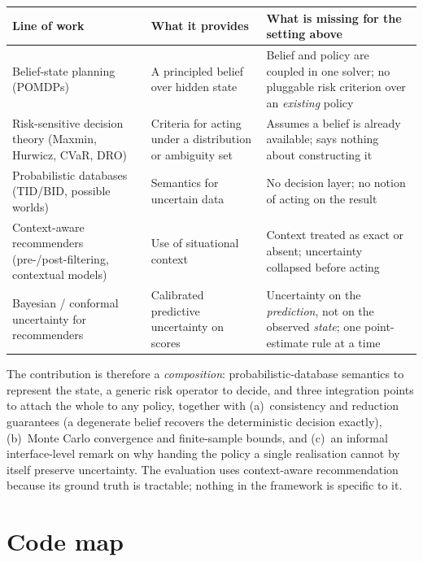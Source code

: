 \documentclass[11pt]{article}
\begin{document}
\begin{center}
\small

\begin{tabular}{>{\raggedright\arraybackslash}p{3.6cm}>{\raggedright\arraybackslash}p{5.3cm}>{\raggedright\arraybackslash}p{5.6cm}}
\toprule
\textbf{Line of work} & \textbf{What it provides} & \textbf{What is missing for the setting above}\\
\midrule
Belief-state planning (POMDPs) & A principled belief over hidden state & Belief and policy are coupled in one solver; no pluggable risk criterion over an \emph{existing} policy\\
Risk-sensitive decision theory (Maxmin, Hurwicz, CVaR, DRO) & Criteria for acting under a distribution or ambiguity set & Assumes a belief is already available; says nothing about constructing it\\
Probabilistic databases (TID/BID, possible worlds) & Semantics for uncertain data & No decision layer; no notion of acting on the result\\
Context-aware recommenders (pre-/post-filtering, contextual models) & Use of situational context & Context treated as exact or absent; uncertainty collapsed before acting\\
Bayesian / conformal uncertainty for recommenders & Calibrated predictive uncertainty on scores & Uncertainty on the \emph{prediction}, not on the observed \emph{state}; one point-estimate rule at a time\\
\bottomrule
\end{tabular}
\end{center}

\noindent The contribution is therefore a \emph{composition}: probabilistic-database semantics to represent the state, a generic risk operator to decide, and three integration points to attach the whole to any policy, together with (a)~consistency and reduction guarantees (a degenerate belief recovers the deterministic decision exactly), (b)~Monte Carlo convergence and finite-sample bounds, and (c)~an informal interface-level remark on why handing the policy a single realisation cannot by itself preserve uncertainty. The evaluation uses context-aware recommendation because its ground truth is tractable; nothing in the framework is specific to it.

\section{Code map}
\end{document}
